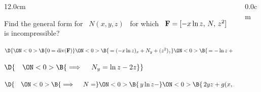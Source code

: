 \begin{frame}
\frametitle{}
\scriptsize
\begin{columns}\begin{column}{12.0cm}

\EX Find the general form for \, $N(x,y,z)$ \, for which \, ${\bf F} = [-x\ln z,\, N,\, z^2]$ \,\, is incompressible?

\vspace{0.2cm}


\vspace{0.2cm}


\vspace{0.2cm}

$\D{
\ON<0>{\B{0 = \text{div}({\bf F})}}
\ON<0>{\B{ \, = (-x\ln z)_x + N_y + (z^2)_z }}
\ON<0>{\B{ \, = -\ln z + N_y + 2z}}}$

\vspace{0.2cm}

$\D{\quad 
\ON<0>{\B{\implies \quad N_y = \ln z - 2z}}}$

\vspace{0.2cm}

$\D{\quad 
\ON<0>{\B{\implies \quad N = }}
\ON<0>{\B{\, y\ln z - }}
\ON<0>{\B{\,2yz + g(x,z)}} \qquad }$ 
 
\vspace{5.8cm}

	
\end{column}\begin{column}{0.0cm}\end{column}\end{columns}
\end{frame}


